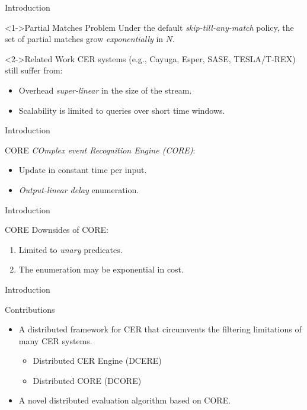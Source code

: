 \documentclass[xcolor=pdftex,dvipsnames,table]{beamer}
\begin{document}

\begin{frame}{Introduction}
 \begin{block}<1->{Partial Matches Problem}
   Under the default \emph{skip-till-any-match} \cite{skip-till-any-match} policy, the set of partial matches grow \emph{exponentially} in $N$.
 \end{block}
 \begin{block}<2->{Related Work}
    CER systems (e.g., Cayuga, Esper, SASE, TESLA/T-REX) still suffer from:
    \begin{itemize}
      \item Overhead \emph{super-linear} in the size of the stream.
      \item Scalability is limited to queries over short time windows.
    \end{itemize}
  \end{block}
\end{frame}


\begin{frame}{Introduction}
  \begin{block}{CORE}
   \emph{COmplex event Recognition Engine (CORE)\cite{core}}:
   \begin{itemize}
      \item Update in constant time per input.
      \item \emph{Output-linear delay} enumeration.
   \end{itemize}
 \end{block}
\end{frame}

\begin{frame}{Introduction}
  \begin{block}{CORE}
    Downsides of CORE:
   \begin{enumerate}
     \item Limited to \emph{unary} predicates.
     \pause
     \item The enumeration may be exponential in cost.
   \end{enumerate}
 \end{block}
\end{frame}


\begin{frame}{Introduction}
  \begin{block}{Contributions}
   \begin{itemize}
     \item A distributed framework for CER that circumvents the filtering limitations of many CER systems.
      \begin{itemize}
        \pause
        \item Distributed CER Engine (DCERE)
        \pause
        \item Distributed CORE (DCORE)
      \end{itemize}
     \pause
     \item A novel distributed evaluation algorithm based on CORE.
   \end{itemize}
 \end{block}
\end{frame}
\end{document}
